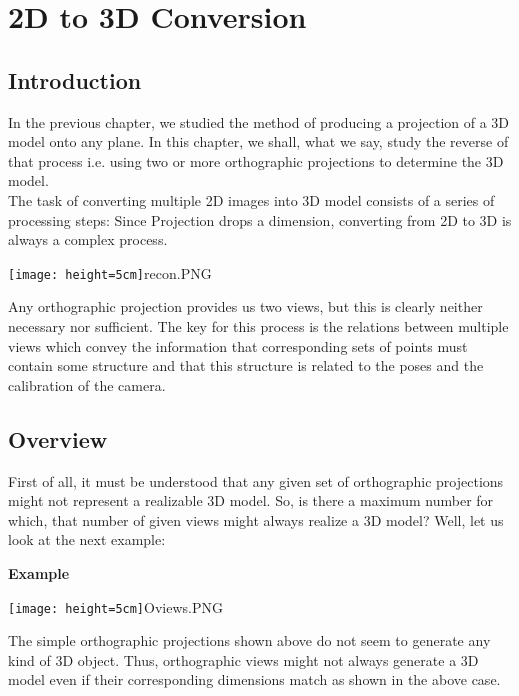 \documentclass[12pt]{report}
\begin{document}

\chapter{2D to 3D Conversion}

\section{Introduction}

In the previous chapter, we studied the method of producing a projection of a 3D model onto any plane. In this chapter, we shall, what we say, study the reverse of that process i.e. using two or more orthographic projections to determine the 3D model.
\\
The task of converting multiple 2D images into 3D model consists of a series of processing steps: Since Projection drops a dimension, converting from 2D to 3D is always a complex process.
\\
\begin{center}
  \texttt{[image: height=5cm]}{recon.PNG}
\end{center}

Any orthographic projection provides us two views, but this is clearly neither necessary nor sufficient. The key for this process is the relations between multiple views which convey the information that corresponding sets of points must contain some structure and that this structure is related to the poses and the calibration of the camera.
\\
\section{Overview}

First of all, it must be understood that any given set of orthographic projections might not represent a realizable 3D model. So, is there a maximum number for which, that number of given views might always realize a 3D model?  Well, let us look at the next example:

\large{\textbf{Example}}

\begin{center}
  \texttt{[image: height=5cm]}{Oviews.PNG}
\end{center}

The simple orthographic projections shown above do not seem to generate any kind of 3D object. Thus, orthographic views might not always generate a 3D model even if their corresponding dimensions match as shown in the above case.
\\
\end{document}
